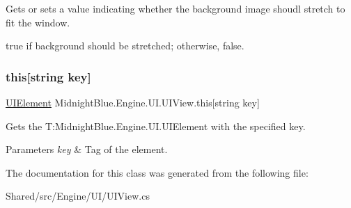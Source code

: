 Gets or sets a value indicating whether the background image shoudl stretch to fit the window. 

{\ttfamily true} if background should be stretched; otherwise, {\ttfamily false}.\hypertarget{class_midnight_blue_1_1_engine_1_1_u_i_1_1_u_i_view_a99db2ffa2be79afc3a2daca105c6eb98}{}\label{class_midnight_blue_1_1_engine_1_1_u_i_1_1_u_i_view_a99db2ffa2be79afc3a2daca105c6eb98} 
\subsubsection{\texorpdfstring{this[string key]}{this[string key]}}
{\footnotesize\ttfamily \hyperlink{class_midnight_blue_1_1_engine_1_1_u_i_1_1_u_i_element}{U\+I\+Element} Midnight\+Blue.\+Engine.\+U\+I.\+U\+I\+View.\+this\mbox{[}string key\mbox{]}\hspace{0.3cm}{\ttfamily [get]}}



Gets the T\+:\+Midnight\+Blue.\+Engine.\+U\+I.\+U\+I\+Element with the specified key. 


\begin{DoxyParams}{Parameters}
{\em key} & Tag of the element.\\
\hline
\end{DoxyParams}


The documentation for this class was generated from the following file\+:\begin{DoxyCompactItemize}
\item 
Shared/src/\+Engine/\+U\+I/U\+I\+View.\+cs\end{DoxyCompactItemize}
